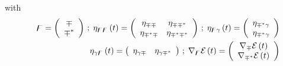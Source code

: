 with 
\begin{eqnarray}
&&{\bf \digamma }=\left( 
\begin{array}{c}
{\cal \Upsilon } \\ 
{\cal \Upsilon }^{\ast }%
\end{array}%
\right) \,;\;\eta _{\digamma \digamma }\left( t\right) =\left( 
\begin{array}{cc}
\eta _{{\cal \Upsilon \Upsilon }} & \eta _{{\cal \Upsilon \Upsilon }^{\ast }}
\\ 
\eta _{{\cal \Upsilon }^{\ast }{\cal \Upsilon }} & \eta _{{\cal \Upsilon }%
^{\ast }{\cal \Upsilon }^{\ast }}%
\end{array}%
\right) \,;\;\eta _{{\bf \digamma }\gamma }\left( t\right) =\left( 
\begin{array}{c}
\eta _{{\cal \Upsilon }^{\ast }\gamma } \\ 
\eta _{{\cal \Upsilon }^{\ast }\gamma }%
\end{array}%
\right)  \nonumber \\
&&\eta _{\gamma {\bf \digamma }}\left( t\right) =\left( 
\begin{array}{cc}
\eta _{\gamma {\cal \Upsilon }} & \eta _{\gamma {\cal \Upsilon }^{\ast }}%
\end{array}%
\right) \,;\;\nabla _{\digamma }{\cal E}\left( t\right) =\left( 
\begin{array}{c}
\nabla _{{\cal \Upsilon }}{\cal E}\left( t\right) \\ 
\nabla _{{\cal \Upsilon }^{\ast }}{\cal E}\left( t\right)%
\end{array}%
\right)
\end{eqnarray}

